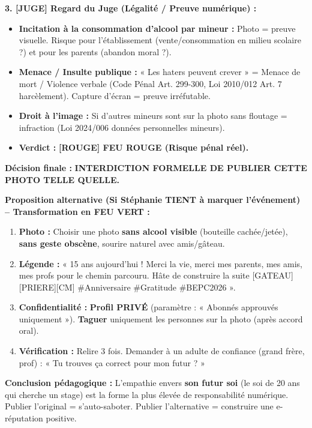 \documentclass[11pt]{article}
\newcommand{\cle}[1]{{\popxbold\color{popdark}#1}}
\begin{document}
\begin{exoresolu}
\textbf{3. [JUGE] Regard du Juge (Légalité / Preuve numérique) :}
\begin{itemize}
    \item \textbf{Incitation à la consommation d'alcool par mineur :} Photo = preuve visuelle. Risque pour l'établissement (vente/consommation en milieu scolaire ?) et pour les parents (abandon moral ?).
    \item \textbf{Menace / Insulte publique :} « Les haters peuvent crever » = Menace de mort / Violence verbale (Code Pénal Art. 299-300, Loi 2010/012 Art. 7 harcèlement). Capture d'écran = preuve irréfutable.
    \item \textbf{Droit à l'image :} Si d'autres mineurs sont sur la photo sans floutage = infraction (Loi 2024/006 données personnelles mineurs).
    \item \textbf{Verdict :} \textbf{[ROUGE] FEU ROUGE (Risque pénal réel).}
\end{itemize}

\textbf{Décision finale :} \textbf{INTERDICTION FORMELLE DE PUBLIER CETTE PHOTO TELLE QUELLE.}

\textbf{Proposition alternative (Si Stéphanie TIENT à marquer l'événement) -- Transformation en FEU VERT :}
\begin{enumerate}
    \item \textbf{Photo :} Choisir une photo \textbf{sans alcool visible} (bouteille cachée/jetée), \textbf{sans geste obscène}, sourire naturel avec amis/gâteau.
    \item \textbf{Légende :} « 15 ans aujourd'hui ! Merci la vie, merci mes parents, mes amis, mes profs pour le chemin parcouru. Hâte de construire la suite [GATEAU][PRIERE][CM] \#Anniversaire \#Gratitude \#BEPC2026 ».
    \item \textbf{Confidentialité :} \textbf{Profil PRIVÉ} (paramètre : « Abonnés approuvés uniquement »). \textbf{Taguer} uniquement les personnes sur la photo (après accord oral).
    \item \textbf{Vérification :} Relire 3 fois. Demander à un adulte de confiance (grand frère, prof) : « Tu trouves ça correct pour mon futur ? »
\end{enumerate}

\textbf{Conclusion pédagogique :} L'empathie envers \textbf{son futur soi} (le soi de 20 ans qui cherche un stage) est la forme la plus élevée de responsabilité numérique. Publier l'original = s'auto-saboter. Publier l'alternative = construire une \cle{e-réputation positive}.
\end{exoresolu}
\end{document}
